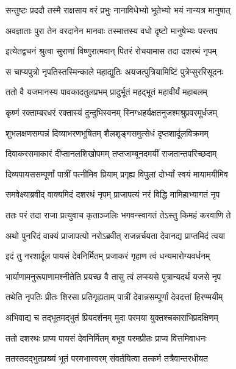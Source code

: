 \twolineshloka
{सन्तुष्टः प्रददौ तस्मै राक्षसाय वरं प्रभुः}
{नानाविधेभ्यो भूतेभ्यो भयं नान्यत्र मानुषात्} %

\twolineshloka
{अवज्ञाताः पुरा तेन वरदानेन मानवाः}
{तस्मात्तस्य वधो दृष्टो मानुषेभ्यः परन्तप} %

\twolineshloka
{इत्येतद्वचनं श्रुत्वा सुराणां विष्णुरात्मवान्}
{पितरं रोचयामास तदा दशरथं नृपम्} %

\twolineshloka
{स चाप्यपुत्रो नृपतिस्तस्मिन्काले महाद्युतिः}
{अयजत्पुत्रियामिष्टिं पुत्रेप्सुररिसूदनः} %

\twolineshloka
{ततो वै यजमानस्य पावकादतुलप्रभम्}
{प्रादुर्भूतं महद्भूतं महावीर्यं महाबलम्} %

\twolineshloka
{कृष्णं रक्ताम्बरधरं रक्तास्यं दुन्दुभिस्वनम्}
{स्निग्धहर्यक्षतनुजश्मश्रुप्रवरमूर्धजम्} %

\twolineshloka
{शुभलक्षणसम्पन्नं दिव्याभरणभूषितम्}
{शैलशृङ्गसमुत्सेधं दृप्तशार्दूलविक्रमम्} %

\twolineshloka
{दिवाकरसमाकारं दीप्तानलशिखोपमम्}
{तप्तजाम्बूनदमयीं राजतान्तपरिच्छदाम्} %

\twolineshloka
{दिव्यपायससम्पूर्णां पात्रीं पत्नीमिव प्रियाम्}
{प्रगृह्य विपुलां दोर्भ्यां स्वयं मायामयीमिव} %

\twolineshloka
{समवेक्ष्याब्रवीद् वाक्यमिदं दशरथं नृपम्}
{प्राजापत्यं नरं विद्धि मामिहाभ्यागतं नृप} %

\twolineshloka
{ततः परं तदा राजा प्रत्युवाच कृताञ्जलिः}
{भगवन्स्वागतं तेऽस्तु किमहं करवाणि ते} %

\twolineshloka
{अथो पुनरिदं वाक्यं प्राजापत्यो नरोऽब्रवीत्}
{राजन्नर्चयता देवानद्य प्राप्तमिदं त्वया} %

\twolineshloka
{इदं तु नरशार्दूल पायसं देवनिर्मितम्}
{प्रजाकरं गृहाण त्वं धन्यमारोग्यवर्धनम्} %

\twolineshloka
{भार्याणामनुरूपाणामश्नीतेति प्रयच्छ वै}
{तासु त्वं लप्स्यसे पुत्रान्यदर्थं यजसे नृप} %

\twolineshloka
{तथेति नृपतिः प्रीतः शिरसा प्रतिगृह्यताम्}
{पात्रीं देवान्नसम्पूर्णां देवदत्तां हिरण्मयीम्} %

\twolineshloka
{अभिवाद्य च तद्भूतमद्भुतं प्रियदर्शनम्}
{मुदा परमया युक्तश्चकाराभिप्रदक्षिणम्} %

\twolineshloka
{ततो दशरथः प्राप्य पायसं देवनिर्मितम्}
{बभूव परमप्रीतः प्राप्य वित्तमिवाधनः} %

\twolineshloka
{ततस्तदद्भुतप्रख्यं भूतं परमभास्वरम्}
{संवर्तयित्वा तत्कर्म तत्रैवान्तरधीयत} %

